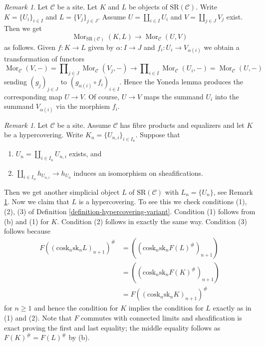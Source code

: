 \documentclass{stacks-project}
\theoremstyle{plain}
\theoremstyle{definition}
\theoremstyle{remark}
\newtheorem{remark}[subsection]{Remark}
\numberwithin{equation}{subsection}
\def\Mor{\mathop{\mathrm{Mor}}\nolimits}
\begin{document}
\begin{remark}
\label{remark-taking-disjoint-unions}
Let $\mathcal{C}$ be a site. Let
$K$ and $L$ be objects of $\text{SR}(\mathcal{C})$.
Write $K = \{U_i\}_{i \in I}$ and $L = \{V_j\}_{j \in J}$.
Assume $U = \coprod_{i \in I} U_i$ and $V = \coprod_{j \in J} V_j$
exist. Then we get
$$
\Mor_{\text{SR}(\mathcal{C})}(K, L) \longrightarrow \Mor_\mathcal{C}(U, V)
$$
as follows. Given $f : K \to L$ given by $\alpha : I \to J$
and $f_i : U_i \to V_{\alpha(i)}$ we obtain a transformation of functors
$$
\Mor_\mathcal{C}(V, -) =
\prod\nolimits_{j \in J} \Mor_\mathcal{C}(V_j, -)
\to
\prod\nolimits_{i \in I} \Mor_\mathcal{C}(U_i, -) =
\Mor_\mathcal{C}(U, -)
$$
sending $(g_j)_{j \in J}$ to
$(g_{\alpha(i)} \circ f_i)_{i \in I}$. Hence the Yoneda lemma
produces the corresponding map $U \to V$. Of course, $U \to V$
maps the summand $U_i$ into the summand $V_{\alpha(i)}$ via
the morphism $f_i$.
\end{remark}

\begin{remark}
\label{remark-take-unions-hypercovering}
Let $\mathcal{C}$ be a site. Assume $\mathcal{C}$ has
fibre products and equalizers and let $K$ be a hypercovering.
Write $K_n = \{U_{n, i}\}_{i \in I_n}$. Suppose that
\begin{enumerate}
\item[(a)] $U_n = \coprod_{i \in I_n} U_{n, i}$ exists, and
\item[(b)] $\coprod_{i \in I_n} h_{U_{n, i}} \to h_{U_n}$ induces
an isomorphism on sheafifications.
\end{enumerate}
Then we get another simplicial object $L$ of $\text{SR}(\mathcal{C})$
with $L_n = \{U_n\}$, see
Remark \ref{remark-taking-disjoint-unions}.
Now we claim that $L$ is a hypercovering.
To see this we check conditions (1), (2), (3) of
Definition \ref{definition-hypercovering-variant}.
Condition (1) follows from (b) and (1) for $K$.
Condition (2) follows in exactly the same way.
Condition (3) follows because
\begin{align*}
F((\text{cosk}_n \text{sk}_n L)_{n + 1})^\#
& =
((\text{cosk}_n \text{sk}_n F(L)^\#)_{n + 1}) \\
& =
((\text{cosk}_n \text{sk}_n F(K)^\#)_{n + 1}) \\
& =
F((\text{cosk}_n \text{sk}_n K)_{n + 1})^\#
\end{align*}
for $n \geq 1$ and hence the condition for $K$ implies the condition for
$L$ exactly as in (1) and (2).
Note that $F$ commutes with connected limits and sheafification is exact
proving the first and last equality; the middle equality follows as
$F(K)^\# = F(L)^\#$ by (b).
\end{remark}
\end{document}
